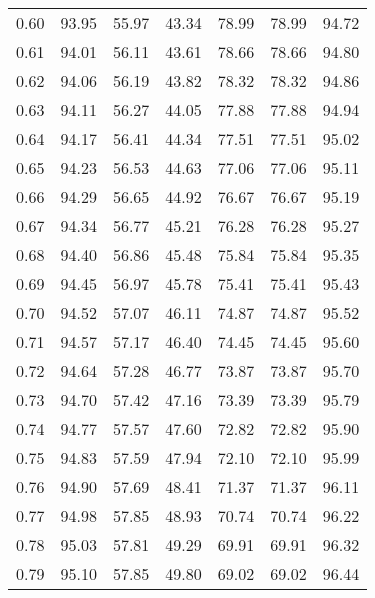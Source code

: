 \begin{tabular}{|c|c|c|c|c|c|c|}
      0.60 &     93.95 &     55.97 &      43.34 &   78.99 &      78.99 &         94.72 \\
      0.61 &     94.01 &     56.11 &      43.61 &   78.66 &      78.66 &         94.80 \\
      0.62 &     94.06 &     56.19 &      43.82 &   78.32 &      78.32 &         94.86 \\
      0.63 &     94.11 &     56.27 &      44.05 &   77.88 &      77.88 &         94.94 \\
      0.64 &     94.17 &     56.41 &      44.34 &   77.51 &      77.51 &         95.02 \\
      0.65 &     94.23 &     56.53 &      44.63 &   77.06 &      77.06 &         95.11 \\
      0.66 &     94.29 &     56.65 &      44.92 &   76.67 &      76.67 &         95.19 \\
      0.67 &     94.34 &     56.77 &      45.21 &   76.28 &      76.28 &         95.27 \\
      0.68 &     94.40 &     56.86 &      45.48 &   75.84 &      75.84 &         95.35 \\
      0.69 &     94.45 &     56.97 &      45.78 &   75.41 &      75.41 &         95.43 \\
      0.70 &     94.52 &     57.07 &      46.11 &   74.87 &      74.87 &         95.52 \\
      0.71 &     94.57 &     57.17 &      46.40 &   74.45 &      74.45 &         95.60 \\
      0.72 &     94.64 &     57.28 &      46.77 &   73.87 &      73.87 &         95.70 \\
      0.73 &     94.70 &     57.42 &      47.16 &   73.39 &      73.39 &         95.79 \\
      0.74 &     94.77 &     57.57 &      47.60 &   72.82 &      72.82 &         95.90 \\
      0.75 &     94.83 &     57.59 &      47.94 &   72.10 &      72.10 &         95.99 \\
      0.76 &     94.90 &     57.69 &      48.41 &   71.37 &      71.37 &         96.11 \\
      0.77 &     94.98 &     57.85 &      48.93 &   70.74 &      70.74 &         96.22 \\
      0.78 &     95.03 &     57.81 &      49.29 &   69.91 &      69.91 &         96.32 \\
      0.79 &     95.10 &     57.85 &      49.80 &   69.02 &      69.02 &         96.44 \\

\end{tabular}
